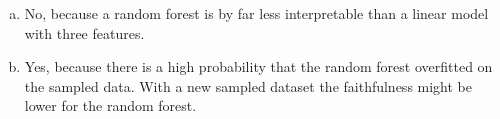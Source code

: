 {\begin{enumerate}[a)]
  \item No, because a random forest is by far less interpretable than a linear model
  with three features.

  \item Yes, because there is a high probability that the random forest overfitted on the sampled data.
    With a new sampled dataset the faithfulness might be lower for the random forest.
\end{enumerate}
}
